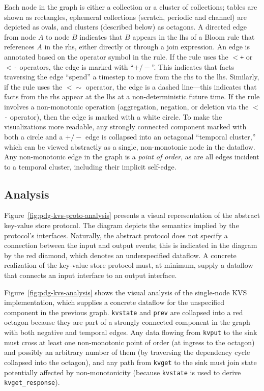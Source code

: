 Each node in the graph is either a collection or a cluster of collections;
tables are shown as rectangles, ephemeral collections (scratch, periodic and
channel) are depicted as ovals, and clusters (described below) as octagons. A
directed edge from node $A$ to node $B$ indicates that $B$ appears in the lhs of
a Bloom rule that references $A$ in the rhs, either directly or through a join
expression. An edge is annotated based on the operator symbol in the rule. If
the rule uses the \texttt{$<$+} or \texttt{$<$-} operators, the edge is marked
with ``$+/-$''. This indicates that facts traversing the edge ``spend'' a
timestep to move from the rhs to the lhs. Similarly, if the rule uses the
\texttt{$<\sim$} operator, the edge is a dashed line---this indicates that facts
from the rhs appear at the lhs at a non-deterministic future time. If the rule
involves a non-monotonic operation (aggregation, negation, or deletion via the \texttt{$<$-}
operator), then the edge is marked with a white circle.  To make the
visualizations more readable, any strongly connected component marked with both
a circle and a $+/-$ edge is collapsed into an octagonal ``temporal cluster,''
which can be viewed abstractly as a single, non-monotonic node in the
dataflow. Any non-monotonic edge in the graph is a \emph{point of order}, as are
all edges incident to a temporal cluster, including their implicit self-edge.

\subsection{Analysis}
Figure~\ref{fig:pdg-kvs-proto-analysis} presents a visual representation of the
abstract key-value store protocol. The diagram depicts the semantics implied by
the protocol's interfaces. Naturally, the abstract protocol does not specify a
connection between the input and output events; this is indicated in the diagram
by the red diamond, which denotes an underspecified dataflow. A concrete
realization of the key-value store protocol must, at minimum, supply a dataflow
that connects an input interface to an output interface.

Figure~\ref{fig:pdg-kvs-analysis} shows the visual analysis of the single-node
KVS implementation, which supplies a concrete dataflow for the unspecified
component in the previous graph.  \texttt{kvstate} and \texttt{prev} are
collapsed into a red octagon because they are part of a strongly connected
component in the graph with both negative and temporal edges.  Any data flowing
from \texttt{kvput} to the sink must cross at least one non-monotonic point of
order (at ingress to the octagon) and possibly an arbitrary number of them
(by traversing the dependency cycle collapsed into the octagon), and any path from \texttt{kvget} to the sink must join
state potentially affected by non-monotonicity (because \texttt{kvstate} is used
to derive \texttt{kvget\_response}).

